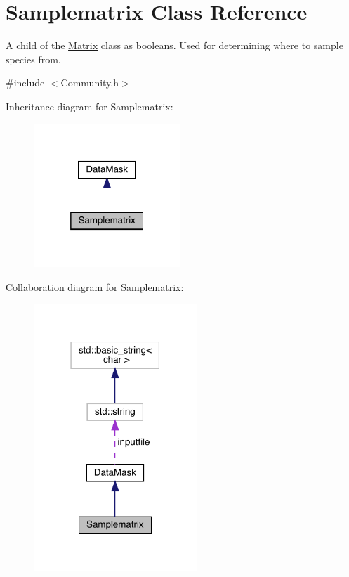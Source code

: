 \hypertarget{class_samplematrix}{}\section{Samplematrix Class Reference}
\label{class_samplematrix}


A child of the \hyperlink{class_matrix}{Matrix} class as booleans. Used for determining where to sample species from.  




{\ttfamily \#include $<$Community.\+h$>$}



Inheritance diagram for Samplematrix\+:
\nopagebreak
\begin{figure}[H]
\begin{center}
\leavevmode
\includegraphics[width=157pt]{class_samplematrix__inherit__graph}
\end{center}
\end{figure}


Collaboration diagram for Samplematrix\+:
\nopagebreak
\begin{figure}[H]
\begin{center}
\leavevmode
\includegraphics[width=174pt]{class_samplematrix__coll__graph}
\end{center}
\end{figure}

